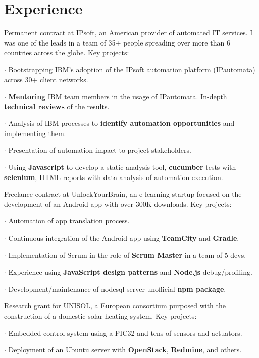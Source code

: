 \section*{Experience}

{
Permanent contract at IPsoft, an American provider of automated IT services.  I
was one of the leads in a team of 35+ people spreading over more than 6
countries across the globe. Key projects:

$\cdot$ Bootstrapping IBM's adoption of the IPsoft automation platform (IPautomata) across 30+ client networks.

$\cdot$ \textbf{Mentoring} IBM team members in the usage of IPautomata. In-depth \textbf{technical reviews} of the results.

$\cdot$ Analysis of IBM processes to \textbf{identify automation opportunities} and implementing them.

$\cdot$ Presentation of automation impact to project stakeholders.

$\cdot$ Using \textbf{Javascript} to develop a static analysis tool, \textbf{cucumber} tests with \textbf{selenium}, HTML reports with data analysis of automation execution.
}

\vspace{\baselineskip}
{
Freelance contract at UnlockYourBrain, an e-learning startup focused on the development
of an Android app with over 300K downloads. Key projects:

$\cdot$  Automation of app translation process.

$\cdot$  Continuous integration of the Android app using \textbf{TeamCity} and \textbf{Gradle}.

$\cdot$  Implementation of Scrum in the role of \textbf{Scrum Master} in a team of 5 devs.

$\cdot$  Experience using \textbf{JavaScript design patterns} and \textbf{Node.js} debug/profiling.

$\cdot$  Development/maintenance of nodesql-server-unofficial \textbf{npm package}.
}

\vspace{\baselineskip}
{
Research grant for UNISOL, a European consortium purposed with the construction
of a domestic solar heating system. Key projects:

$\cdot$  Embedded control system using a PIC32 and tens of sensors and
actuators.

$\cdot$  Deployment of an Ubuntu server with \textbf{OpenStack}, \textbf{Redmine}, and others.
}

